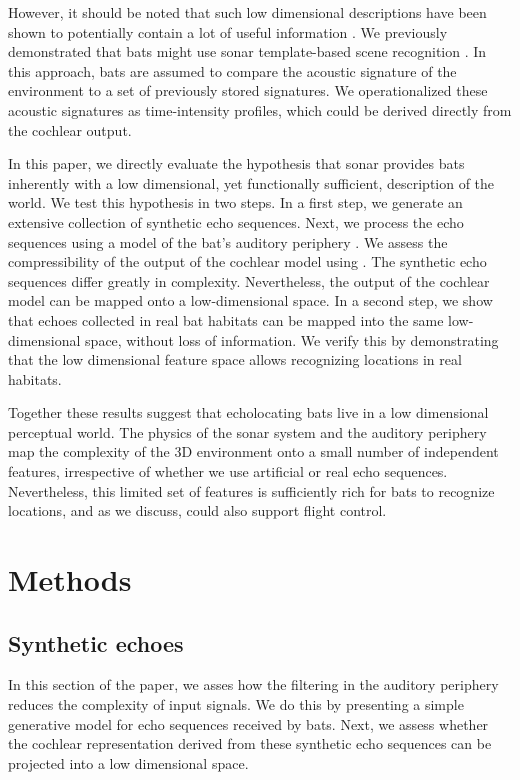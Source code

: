\documentclass[preprint,5p]{elsarticle}
\begin{document}
However, it should be noted that such low dimensional descriptions have been shown to potentially contain a lot of useful information \citep{Kuc1997b,Kuc1997}. We previously demonstrated that bats might use sonar template-based scene recognition \citep{Vanderelst2016,Vanderelst2017}. In this approach, bats are assumed to compare the acoustic signature of the environment to a set of previously stored signatures. We operationalized these acoustic signatures as time-intensity profiles, which could be derived directly from the cochlear output.

In this paper, we directly evaluate the hypothesis that sonar provides bats inherently with a low dimensional, yet functionally sufficient, description of the world. We test this hypothesis in two steps. In a first step, we generate an extensive collection of synthetic echo sequences. Next, we process the echo sequences using a model of the bat's auditory periphery \citep{Wiegrebe2008}. We assess the compressibility of the output of the cochlear model using \PCA. The synthetic echo sequences differ greatly in complexity. Nevertheless, the output of the cochlear model can be mapped onto a low-dimensional space. In a second step, we show that echoes collected in real bat habitats can be mapped into the same low-dimensional space, without loss of information. We verify this by demonstrating that the low dimensional feature space allows recognizing locations in real habitats. 

Together these results suggest that echolocating bats live in a low dimensional perceptual world. The physics of the sonar system and the auditory periphery map the complexity of the 3D environment onto a small number of independent features, irrespective of whether we use artificial or real echo sequences. Nevertheless, this limited set of features is sufficiently rich for bats to recognize locations, and as we discuss, could also support flight control.

\section{Methods}

\subsection{Synthetic echoes}

In this section of the paper, we asses how the filtering in the auditory periphery reduces the complexity of input signals. We do this by presenting a simple generative model for echo sequences received by bats. Next, we assess whether the cochlear representation derived from these synthetic echo sequences can be projected into a low dimensional space. 
\end{document}
